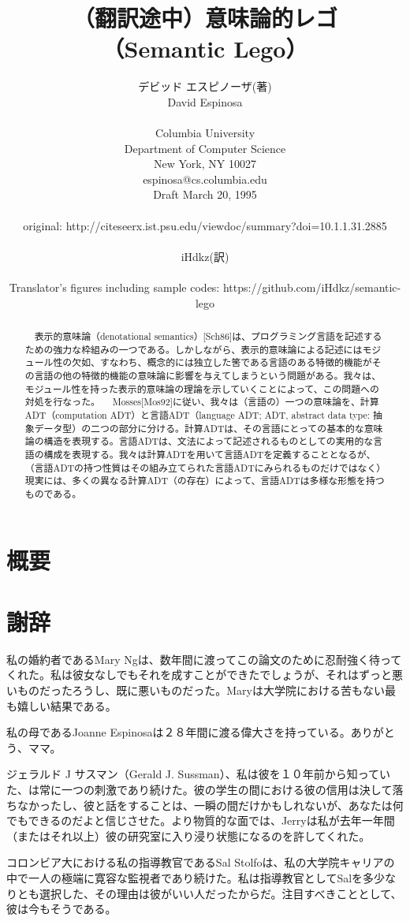 \documentclass[11pt, oneside]{jsbook}   	%
\title{（翻訳途中）意味論的レゴ \\
（Semantic Lego）
}
\author{デビッド エスピノーザ(著)\\
David Espinosa\\
\\
Columbia University
\\
Department of Computer Science
\\
New York, NY 10027
\\
espinosa@cs.columbia.edu
\\
Draft March 20, 1995
\\
\\
original: http://citeseerx.ist.psu.edu/viewdoc/summary?doi=10.1.1.31.2885
\\
\\
iHdkz(訳)\\
\begin{small}
Translator's figures including sample codes: https://github.com/iHdkz/semantic-lego
\end{small}
}
\date{}							%
\begin{document}
\maketitle


\newpage

\section*{概要}
\begin{abstract}
　表示的意味論（denotational semantics）[Sch86]は、プログラミング言語を記述するための強力な枠組みの一つである。しかしながら、表示的意味論による記述にはモジュール性の欠如、すなわち、概念的には独立した筈である言語のある特徴的機能がその言語の他の特徴的機能の意味論に影響を与えてしまうという問題がある。我々は、モジュール性を持った表示的意味論の理論を示していくことによって、この問題への対処を行なった。
　Mosses[Mos92]に従い、我々は（言語の）一つの意味論を、計算ADT（computation ADT）と言語ADT（language ADT; ADT, abstract data type: 抽象データ型）の二つの部分に分ける。計算ADTは、その言語にとっての基本的な意味論の構造を表現する。言語ADTは、文法によって記述されるものとしての実用的な言語の構成を表現する。我々は計算ADTを用いて言語ADTを定義することとなるが、（言語ADTの持つ性質はその組み立てられた言語ADTにみられるものだけではなく）現実には、多くの異なる計算ADT（の存在）によって、言語ADTは多様な形態を持つものである。
\end{abstract}

\newpage
\tableofcontents

\newpage
\section*{謝辞}
私の婚約者であるMary Ngは、数年間に渡ってこの論文のために忍耐強く待ってくれた。私は彼女なしでもそれを成すことができたでしょうが、それはずっと悪いものだったろうし、既に悪いものだった。Maryは大学院における苦もない最も嬉しい結果である。

私の母であるJoanne Espinosaは２８年間に渡る偉大さを持っている。ありがとう、ママ。

ジェラルド J サスマン（Gerald J. Sussman）、私は彼を１０年前から知っていた、は常に一つの刺激であり続けた。彼の学生の間における彼の信用は決して落ちなかったし、彼と話をすることは、一瞬の間だけかもしれないが、あなたは何でもできるのだよと信じさせた。より物質的な面では、Jerryは私が去年一年間（またはそれ以上）彼の研究室に入り浸り状態になるのを許してくれた。

コロンビア大における私の指導教官であるSal Stolfoは、私の大学院キャリアの中で一人の極端に寛容な監視者であり続けた。私は指導教官としてSalを多少なりとも選択した、その理由は彼がいい人だったからだ。注目すべきこととして、彼は今もそうである。
\end{document}
